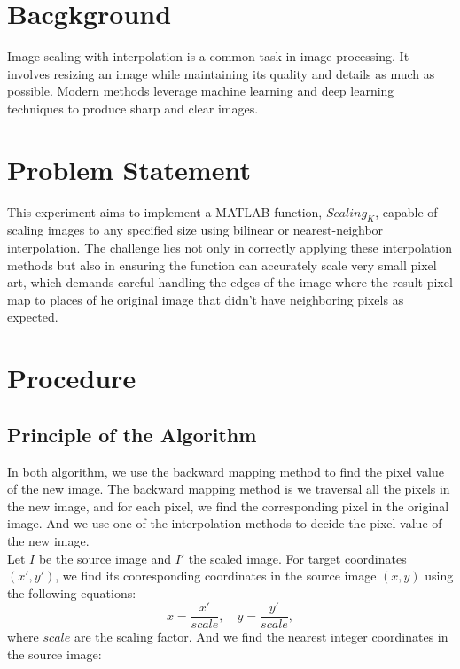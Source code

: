 \documentclass[a4paper,11pt]{article}
\begin{document}
\thispagestyle{empty}

\blankpage

\tableofcontents
\blankpage
\section{Bacgkground}
Image scaling with interpolation is a common task in image processing. It involves resizing an image while maintaining its quality and details as much as possible. Modern methods leverage machine learning and deep learning techniques to produce sharp and clear images.

\section{Problem Statement}
This experiment aims to implement a MATLAB function, $Scaling_K$, capable of scaling images to any specified size using bilinear or nearest-neighbor interpolation. The challenge lies not only in correctly applying these interpolation methods but also in ensuring the function can accurately scale very small pixel art, which demands careful handling the edges of the image where the result pixel map to places of he original image that didn't have neighboring pixels as expected.

\section{Procedure}
\subsection{Principle of the Algorithm}
In both algorithm, we use the backward mapping method to find the pixel value of the new image. The backward mapping method is we traversal all the pixels in the new image, and for each pixel, we find the corresponding pixel in the original image. And we use one of the interpolation methods to decide the pixel value of the new image. \\
Let \( I \) be the source image and \( I' \) the scaled image. For target coordinates \((x', y')\), we find its cooresponding coordinates in the source image \((x, y)\) using the following equations:
\begin{equation}
    x = \frac{x'}{scale}, \quad y = \frac{y'}{scale},
\end{equation}
where $scale$ are the scaling factor. And we find the nearest integer coordinates in the source image:
\end{document}
